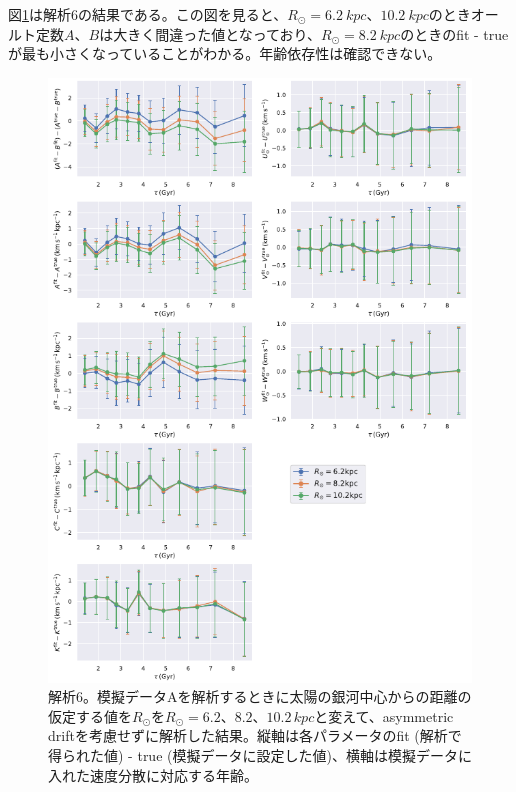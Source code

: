 図\ref{fig:Mock_R0}は解析6の結果である。この図を見ると、$R_{\odot}=\SI{6.2}{kpc}、\SI{10.2}{kpc}$のときオールト定数$A、B$は大きく間違った値となっており、$R_{\odot}=\SI{8.2}{kpc}$のときのfit - trueが最も小さくなっていることがわかる。年齢依存性は確認できない。

\begin{figure}[htbp]
	\centering
	\includegraphics[width=15cm]{fig/Mock_R0.pdf}
	\caption{解析6。模擬データAを解析するときに太陽の銀河中心からの距離の仮定する値を$R_{\odot}$を$R_{\odot} = 6.2、8.2、10.2\,\si{kpc}$と変えて、asymmetric driftを考慮せずに解析した結果。縦軸は各パラメータのfit (解析で得られた値) - true (模擬データに設定した値)、横軸は模擬データに入れた速度分散に対応する年齢。} \label{fig:Mock_R0}
\end{figure}